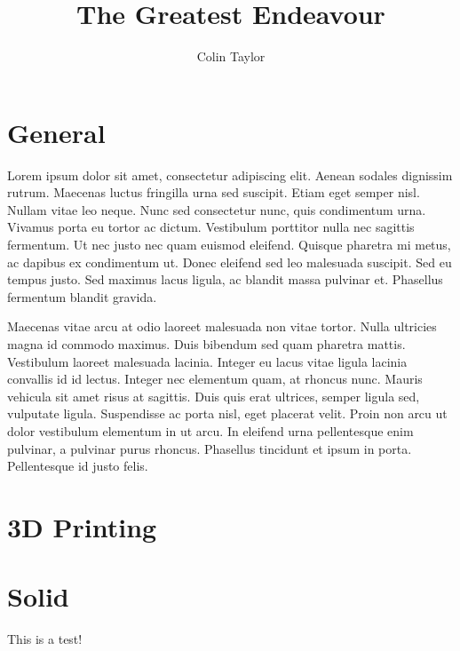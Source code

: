 \documentclass{report}
\title{The Greatest Endeavour}
\author{Colin Taylor}
\begin{document}
\maketitle
\chapter{General}
Lorem ipsum dolor sit amet, consectetur adipiscing elit. Aenean sodales dignissim rutrum. Maecenas luctus fringilla urna sed suscipit. Etiam eget semper nisl. Nullam vitae leo neque. Nunc sed consectetur nunc, quis condimentum urna. Vivamus porta eu tortor ac dictum. Vestibulum porttitor nulla nec sagittis fermentum. Ut nec justo nec quam euismod eleifend. Quisque pharetra mi metus, ac dapibus ex condimentum ut. Donec eleifend sed leo malesuada suscipit. Sed eu tempus justo. Sed maximus lacus ligula, ac blandit massa pulvinar et. Phasellus fermentum blandit gravida.

Maecenas vitae arcu at odio laoreet malesuada non vitae tortor. Nulla ultricies magna id commodo maximus. Duis bibendum sed quam pharetra mattis. Vestibulum laoreet malesuada lacinia. Integer eu lacus vitae ligula lacinia convallis id id lectus. Integer nec elementum quam, at rhoncus nunc. Mauris vehicula sit amet risus at sagittis. Duis quis erat ultrices, semper ligula sed, vulputate ligula. Suspendisse ac porta nisl, eget placerat velit. Proin non arcu ut dolor vestibulum elementum in ut arcu. In eleifend urna pellentesque enim pulvinar, a pulvinar purus rhoncus. Phasellus tincidunt et ipsum in porta. Pellentesque id justo felis.
\chapter{3D Printing}
\chapter{Solid}
This is a test!
\end{document}
